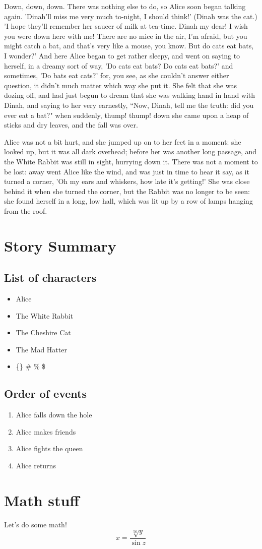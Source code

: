 \documentclass{article}
\begin{document}
\begin{multicols}{2}
Down, down, down. There was nothing else to do, so Alice soon began
talking again. 'Dinah'll miss me very much to-night, I should think!'
(Dinah was the cat.) 'I hope they'll remember her saucer of milk at
tea-time. Dinah my dear! I wish you were down here with me! There are no
mice in the air, I'm afraid, but you might catch a bat, and that's very
like a mouse, you know. But do cats eat bats, I wonder?' And here Alice
began to get rather sleepy, and went on saying to herself, in a dreamy
sort of way, 'Do cats eat bats? Do cats eat bats?' and sometimes, 'Do
bats eat cats?' for, you see, as she couldn't answer either question,
it didn't much matter which way she put it. She felt that she was dozing
off, and had just begun to dream that she was walking hand in hand with
Dinah, and saying to her very earnestly, ``Now, Dinah, tell me the truth:
did you ever eat a bat?" when suddenly, thump! thump! down she came upon
a heap of sticks and dry leaves, and the fall was over.

Alice was not a bit hurt, and she jumped up on to her feet in a moment:
she looked up, but it was all dark overhead; before her was another
long passage, and the White Rabbit was still in sight, hurrying down it.
There was not a moment to be lost: away went Alice like the wind, and
was just in time to hear it say, as it turned a corner, 'Oh my ears
and whiskers, how late it's getting!' She was close behind it when she
turned the corner, but the Rabbit was no longer to be seen: she found
herself in a long, low hall, which was lit up by a row of lamps hanging
from the roof.
\end{multicols}

\section{Story Summary}
\subsection{List of characters}
\begin{itemize}
\item Alice
\item The White Rabbit
\item The Cheshire Cat
\item The Mad Hatter
\item \{\} \# \% \$
\end{itemize}

\subsection{Order of events}
\begin{enumerate}
\item Alice falls down the hole
\item Alice makes friends
\item Alice fights the queen
\item Alice returns
\end{enumerate}

\section{Math stuff}
Let's do some math!
$$ x = \frac{\sqrt[56]{y}}{\sin{z}} $$
\end{document}

